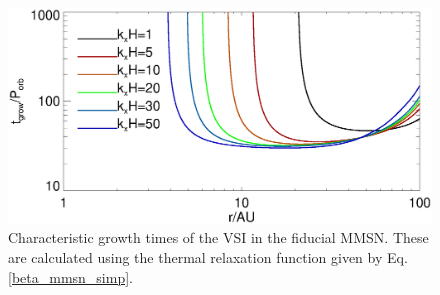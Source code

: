 \begin{figure}
  \includegraphics[width=\linewidth]{figures/eigen_compare_grow.ps}
  \caption{Characteristic growth times of the VSI in 
    the fiducial MMSN. These are calculated using the thermal relaxation
    function given by Eq. \ref{beta_mmsn_simp}. 
    \label{mmsn_overall}}    
\end{figure}
